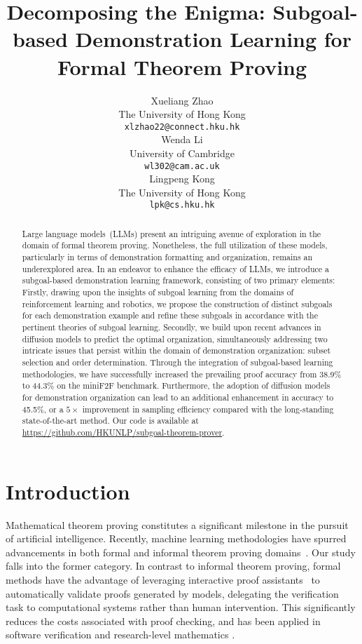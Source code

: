 \documentclass{article}
\title{Decomposing the Enigma: Subgoal-based Demonstration Learning for Formal Theorem Proving}
\author{Xueliang Zhao \\
The University of Hong Kong \\
\texttt{xlzhao22@connect.hku.hk} \\
\And
Wenda Li \\
University of Cambridge \\
\texttt{wl302@cam.ac.uk} \\
\AND
Lingpeng Kong \\
The University of Hong Kong \\
\texttt{lpk@cs.hku.hk} \\
}
\begin{document}
\maketitle


\begin{abstract}
Large language models~(LLMs) present an intriguing avenue of exploration in the domain of formal theorem proving. Nonetheless, the full utilization of these models, particularly in terms of demonstration formatting and organization, remains an underexplored area. In an endeavor to enhance the efficacy of LLMs, we introduce a subgoal-based demonstration learning framework, consisting of two primary elements: Firstly, drawing upon the insights of subgoal learning from the domains of reinforcement learning and robotics, we propose the construction of distinct subgoals for each demonstration example and refine these subgoals in accordance with the pertinent theories of subgoal learning. Secondly, we build upon recent advances in diffusion models to predict the optimal organization, simultaneously addressing two intricate issues that persist within the domain of demonstration organization: subset selection and order determination. Through the integration of subgoal-based learning methodologies, we have successfully increased the prevailing proof accuracy from 38.9\% to 44.3\% on the miniF2F benchmark. Furthermore, the adoption of diffusion models for demonstration organization can lead to an additional enhancement in accuracy to 45.5\%, or a $5\times$ improvement in sampling efficiency compared with the long-standing state-of-the-art method. Our code is available at \url{https://github.com/HKUNLP/subgoal-theorem-prover}.
\end{abstract}

\section{Introduction}

Mathematical theorem proving constitutes a significant milestone in the pursuit of artificial intelligence. Recently, machine learning methodologies have spurred advancements in both formal and informal theorem proving domains~\cite{polu2020generative,lewkowycz2022solving}. Our study falls into the former category. In contrast to informal theorem proving, formal methods have the advantage of leveraging interactive proof assistants~\cite{paulson2000isabelle} to automatically validate proofs generated by models, delegating the verification task to computational systems rather than human intervention. This significantly reduces the costs associated with proof checking, and has been applied in software verification \cite{klein2009sel4} and research-level mathematics \cite{castelvecchi2021mathematicians}. 
\end{document}

